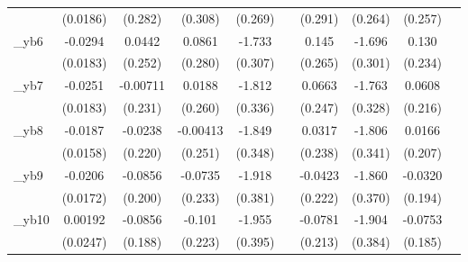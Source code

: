 \begin{table}[htbp]
\begin{tabular}{l*{9}{c}}
            &    (0.0186)         &     (0.282)         &     (0.308)         &     (0.269)         &                     &     (0.291)         &     (0.264)         &     (0.257)         &                     \\
[1em]
\_yb6        &     -0.0294         &      0.0442         &      0.0861         &      -1.733\sym{***}&                     &       0.145         &      -1.696\sym{***}&       0.130         &                     \\
            &    (0.0183)         &     (0.252)         &     (0.280)         &     (0.307)         &                     &     (0.265)         &     (0.301)         &     (0.234)         &                     \\
[1em]
\_yb7        &     -0.0251         &    -0.00711         &      0.0188         &      -1.812\sym{***}&                     &      0.0663         &      -1.763\sym{***}&      0.0608         &                     \\
            &    (0.0183)         &     (0.231)         &     (0.260)         &     (0.336)         &                     &     (0.247)         &     (0.328)         &     (0.216)         &                     \\
[1em]
\_yb8        &     -0.0187         &     -0.0238         &    -0.00413         &      -1.849\sym{***}&                     &      0.0317         &      -1.806\sym{***}&      0.0166         &                     \\
            &    (0.0158)         &     (0.220)         &     (0.251)         &     (0.348)         &                     &     (0.238)         &     (0.341)         &     (0.207)         &                     \\
[1em]
\_yb9        &     -0.0206         &     -0.0856         &     -0.0735         &      -1.918\sym{***}&                     &     -0.0423         &      -1.860\sym{***}&     -0.0320         &                     \\
            &    (0.0172)         &     (0.200)         &     (0.233)         &     (0.381)         &                     &     (0.222)         &     (0.370)         &     (0.194)         &                     \\
[1em]
\_yb10       &     0.00192         &     -0.0856         &      -0.101         &      -1.955\sym{***}&                     &     -0.0781         &      -1.904\sym{***}&     -0.0753         &                     \\
            &    (0.0247)         &     (0.188)         &     (0.223)         &     (0.395)         &                     &     (0.213)         &     (0.384)         &     (0.185)         &                     \\

\end{tabular}
\end{table}
